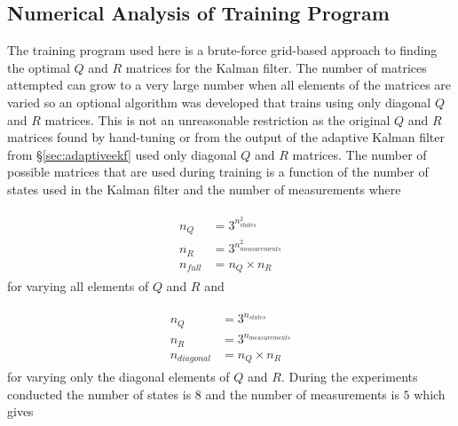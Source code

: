
\subsection{Numerical Analysis of Training Program}
\label{sec:trainingNumericalAnalysis}
The training program used here is a brute-force grid-based approach to finding the optimal $Q$ and $R$ matrices for the Kalman filter. The number of matrices attempted can grow to a very large number when all elements of the matrices are varied so an optional algorithm was developed that trains using only diagonal $Q$ and $R$ matrices. This is not an unreasonable restriction as the original $Q$ and $R$ matrices found by hand-tuning or from the output of the adaptive Kalman filter from \S\ref{sec:adaptiveekf} used only diagonal $Q$ and $R$ matrices. The number of possible matrices that are used during training is a function of the number of states used in the Kalman filter and the number of measurements where

\begin{align}
\label{eq:trainingFullMatrices}
\begin{split}
n_Q &= 3^{n_{states}^2} \\
n_R &= 3^{n_{measurements}^2} \\
n_{full} &= n_Q \times n_R
\end{split}
\end{align}
for varying all elements of $Q$ and $R$ and

\begin{align}
\label{eq:trainingDiagonalMatrices}
\begin{split}
n_Q &= 3^{n_{states}} \\
n_R &= 3^{n_{measurements}} \\
n_{diagonal} &= n_Q \times n_R
\end{split}
\end{align}
for varying only the diagonal elements of $Q$ and $R$. During the experiments conducted the number of states is $8$ and the number of measurements is $5$ which gives

